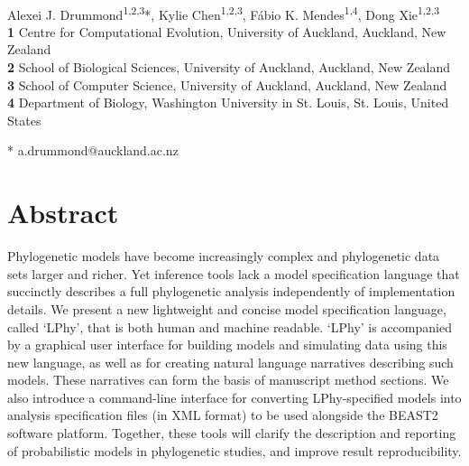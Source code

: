 \documentclass[10pt,letterpaper,table]{article}
\begin{document}
\vspace*{0.2in}

\begin{flushleft}
{\Large
\textbf{} 
}
\newline
\\
Alexei J. Drummond\textsuperscript{1,2,3}*,
Kylie Chen\textsuperscript{1,2,3},
F\'{a}bio K. Mendes\textsuperscript{1,4},
Dong Xie\textsuperscript{1,2,3}
\\
\bigskip
\textbf{1} Centre for Computational Evolution, University of Auckland, Auckland, New Zealand
\\
\textbf{2} School of Biological Sciences, University of Auckland, Auckland, New Zealand
\\
\textbf{3} School of Computer Science, University of Auckland, Auckland, New Zealand
\\
\textbf{4} Department of Biology, Washington University in St. Louis, St. Louis, United States
\\
\bigskip

% 
%

* a.drummond@auckland.ac.nz

\end{flushleft}

\section*{Abstract}
  Phylogenetic models have become increasingly complex and phylogenetic data sets larger and richer.
  Yet inference tools lack a model specification language that succinctly describes a full phylogenetic analysis independently of implementation details.
  We present a new lightweight and concise model specification language, called `LPhy', that is both human and machine readable.
  `LPhy' is accompanied by a graphical user interface for building models and simulating data using this new language, as well as for creating natural language narratives describing such models.
  These narratives can form the basis of manuscript method sections.
  We also introduce a command-line interface for converting LPhy-specified models into analysis specification files (in XML format) to be used alongside the BEAST2 software platform.
  Together, these tools will clarify the description and reporting of probabilistic models in phylogenetic studies, and improve result reproducibility.
\end{document}
